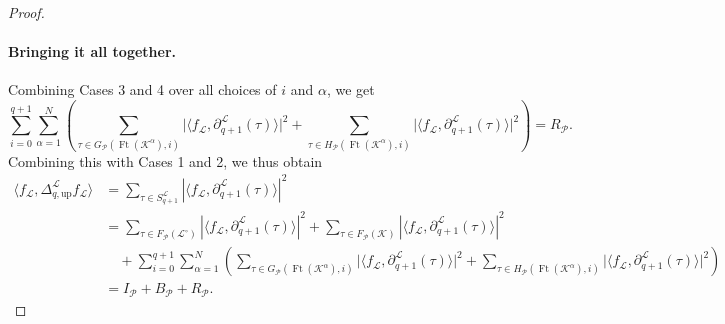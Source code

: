 \documentclass{article}
\newcommand{\KK}{\mathcal{K}}
\newcommand{\LL}{\mathcal{L}}
\newcommand{\Ft}{\operatorname{Ft}}
\begin{document}
\begin{proof}
\paragraph{Bringing it all together.}
Combining Cases 3 and 4 over all choices of $i$ and $\alpha$, we get
\[
\sum_{i=0}^{q+1}\sum_{\alpha=1}^N
\left(
\sum_{\tau\in G_{\mathcal{P}}(\Ft(\KK^\alpha),i)}
\big|\langle f_\LL,\partial_{q+1}^\LL(\tau)\rangle\big|^2
+
\sum_{\tau\in H_{\mathcal{P}}(\Ft(\KK^\alpha),i)}
\big|\langle f_\LL,\partial_{q+1}^\LL(\tau)\rangle\big|^2
\right)
=
R_{\mathcal{P}}.
\]
Combining this with Cases 1 and 2, we thus obtain
\begin{align*}
\langle f_\LL, \Delta_{q, \text{up}}^\LL f_\LL \rangle 
&= \sum_{\tau\in S_{q+1}^\LL}|\langle f_\LL, \partial_{q+1}^\LL(\tau)\rangle|^2\\ 
&= \sum_{\tau\in F_{\mathcal{P}}(\LL^\circ)}|\langle f_\LL, \partial_{q+1}^\LL(\tau)\rangle|^2 + \sum_{\tau\in F_{\mathcal{P}}(\KK)}|\langle f_\LL, \partial_{q+1}^\LL(\tau)\rangle|^2  \\
&\quad +\sum_{i=0}^{q+1}\sum_{\alpha=1}^N
\left(
\sum_{\tau\in G_{\mathcal{P}}(\Ft(\KK^\alpha),i)}
\big|\langle f_\LL,\partial_{q+1}^\LL(\tau)\rangle\big|^2
+
\sum_{\tau\in H_{\mathcal{P}}(\Ft(\KK^\alpha),i)}
\big|\langle f_\LL,\partial_{q+1}^\LL(\tau)\rangle\big|^2
\right)
\\
&= I_\mathcal{P} + B_\mathcal{P} + R_\mathcal{P}.
\end{align*}
\end{proof}
\end{document}
